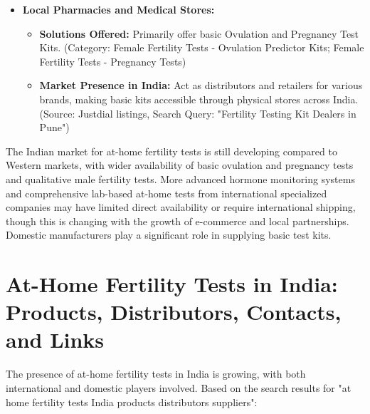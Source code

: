 \documentclass{article}
\begin{document}
\begin{itemize}[label=\textbullet]
    \item \textbf{Local Pharmacies and Medical Stores:}
    \begin{itemize}[label=--]
        \item \textbf{Solutions Offered:} Primarily offer basic Ovulation and Pregnancy Test Kits. (Category: Female Fertility Tests - Ovulation Predictor Kits; Female Fertility Tests - Pregnancy Tests)
        \item \textbf{Market Presence in India:} Act as distributors and retailers for various brands, making basic kits accessible through physical stores across India. (Source: Justdial listings, Search Query: "Fertility Testing Kit Dealers in Pune")
    \end{itemize}
    \vspace{0.5em} %

\end{itemize}

The Indian market for at-home fertility tests is still developing compared to Western markets, with wider availability of basic ovulation and pregnancy tests and qualitative male fertility tests. More advanced hormone monitoring systems and comprehensive lab-based at-home tests from international specialized companies may have limited direct availability or require international shipping, though this is changing with the growth of e-commerce and local partnerships. Domestic manufacturers play a significant role in supplying basic test kits.

\section{At-Home Fertility Tests in India: Products, Distributors, Contacts, and Links}

The presence of at-home fertility tests in India is growing, with both international and domestic players involved. Based on the search results for "at home fertility tests India products distributors suppliers":
\end{document}
